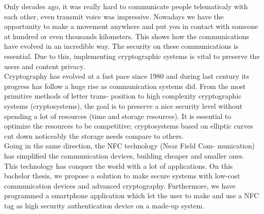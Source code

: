 \documentclass[../PFC.tex]{subfiles}
\begin{document}
Only decades ago, it was really hard to communicate people telematicaly with each other, even transmit voice was impressive. Nowadays we have the opportunity to make a movement anywhere and put you in contact with someone at hundred or even thousands kilometers. This shows how the communications have evolved in an incredible way. The security on these communications is essential. Due to this, implementing cryptographic systems is vital to preserve the users and content privacy.
\*
\vspace{0.5515cm}
\\
Cryptography has evolved at a fast pace since 1980 and during last century its progress has follow a huge rise as communication systems did. From the most primitive methods of letter trans- position to high complexity cryptographic systems (cryptosystems), the goal is to  preserve a nice security level without spending a lot of resources (time and storage resources). It is essential to optimize the resources to be competitive; cryptosystems based on elliptic curves cut down noticeably the storage needs compare to others. 
\*
\vspace{0.5515cm}
\\
Going in the same direction, the NFC technology (Near Field Com- munication) has simplified the communication devices, building cheaper and smaller ones. This technology has conquer the world with a lot of applications. On this bachelor thesis, we propose a solution to make secure systems with low-cost communication devices and advanced cryptography. Furthermore, we have programmed a smartphone application which let the user to make and use a NFC tag as high security authentication device on a made-up system.   
\*
\vspace{0.5515cm}
\\
\end{document}
